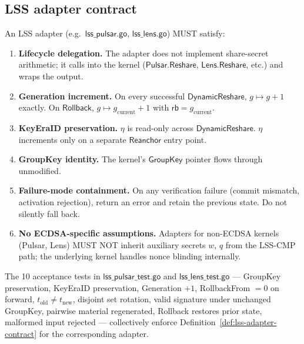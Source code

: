 
\subsection*{LSS adapter contract}

\begin{definition}
\label{def:lss-adapter-contract}
An LSS adapter (e.g.\ $\mathsf{lss\_pulsar.go}$, $\mathsf{lss\_lens.go}$)
MUST satisfy:
\begin{enumerate}[nosep]
  \item \textbf{Lifecycle delegation.} The adapter does not implement
        share-secret arithmetic; it calls into the kernel
        ($\mathsf{Pulsar.Reshare}$, $\mathsf{Lens.Reshare}$, etc.) and
        wraps the output.
  \item \textbf{Generation increment.} On every successful
        $\mathsf{DynamicReshare}$, $g \mapsto g+1$ exactly. On
        $\mathsf{Rollback}$, $g \mapsto g_{\text{current}}+1$ with
        $\mathsf{rb} = g_{\text{current}}$.
  \item \textbf{KeyEraID preservation.} $\eta$ is read-only across
        $\mathsf{DynamicReshare}$. $\eta$ increments only on a separate
        $\mathsf{Reanchor}$ entry point.
  \item \textbf{GroupKey identity.} The kernel's $\mathsf{GroupKey}$
        pointer flows through unmodified.
  \item \textbf{Failure-mode containment.} On any verification failure
        (commit mismatch, activation rejection), return an error and
        retain the previous state. Do not silently fall back.
  \item \textbf{No ECDSA-specific assumptions.} Adapters for non-ECDSA
        kernels (Pulsar, Lens) MUST NOT inherit auxiliary secrets
        $w$, $q$ from the LSS-CMP path; the underlying kernel handles
        nonce blinding internally.
\end{enumerate}
\end{definition}

\begin{remark}
The 10 acceptance tests in $\mathsf{lss\_pulsar\_test.go}$ and
$\mathsf{lss\_lens\_test.go}$ — GroupKey preservation, KeyEraID
preservation, Generation $+1$, RollbackFrom $= 0$ on forward, $t_{\text{old}}
\neq t_{\text{new}}$, disjoint set rotation, valid signature under
unchanged GroupKey, pairwise material regenerated, Rollback restores
prior state, malformed input rejected — collectively enforce
Definition~\ref{def:lss-adapter-contract} for the corresponding
adapter.
\end{remark}
